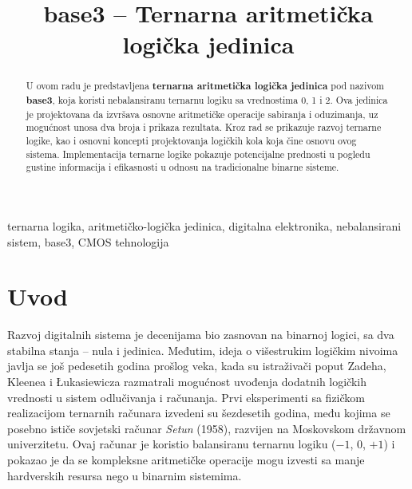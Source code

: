 \documentclass[conference,a4paper]{IEEEtran}
\begin{document}
	
	\title{base3 – Ternarna aritmetička logička jedinica}
	
	\author{
	}
	
	\maketitle
	
	\begin{abstract}
		U ovom radu je predstavljena \textbf{ternarna aritmetička logička jedinica} pod nazivom \textbf{base3}, koja koristi nebalansiranu ternarnu logiku sa vrednostima 0, 1 i 2. Ova jedinica je projektovana da izvršava osnovne aritmetičke operacije sabiranja i oduzimanja, uz mogućnost unosa dva broja i prikaza rezultata. Kroz rad se prikazuje razvoj ternarne logike, kao i osnovni koncepti projektovanja logičkih kola koja čine osnovu ovog sistema. Implementacija ternarne logike pokazuje potencijalne prednosti u pogledu gustine informacija i efikasnosti u odnosu na tradicionalne binarne sisteme.
	\end{abstract}
	
	\begin{IEEEkeywords}
		ternarna logika, aritmetičko-logička jedinica, digitalna elektronika, nebalansirani sistem, base3, CMOS tehnologija
	\end{IEEEkeywords}
	
\section{Uvod}

Razvoj digitalnih sistema je decenijama bio zasnovan na binarnoj logici, sa dva stabilna stanja – nula i jedinica. Međutim, ideja o višestrukim logičkim nivoima javlja se još pedesetih godina prošlog veka, kada su istraživači poput Zadeha, Kleenea i Łukasiewicza razmatrali mogućnost uvođenja dodatnih logičkih vrednosti u sistem odlučivanja i računanja. Prvi eksperimenti sa fizičkom realizacijom ternarnih računara izvedeni su šezdesetih godina, među kojima se posebno ističe sovjetski računar \textit{Setun} (1958), razvijen na Moskovskom državnom univerzitetu. Ovaj računar je koristio balansiranu ternarnu logiku ($-1$, 0, $+1$) i pokazao je da se kompleksne aritmetičke operacije mogu izvesti sa manje hardverskih resursa nego u binarnim sistemima.
\end{document}
